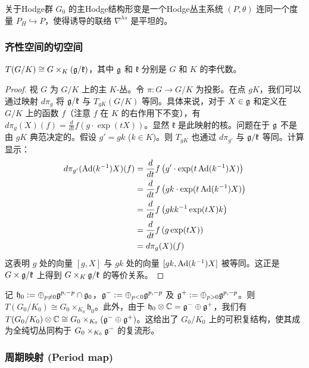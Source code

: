 \begin{definition}
关于Hodge群 $G_0$ 的主Hodge结构形变是一个Hodge丛主系统 $(P, \theta)$ 连同一个度量 $P_H \hookrightarrow P$，使得诱导的联络 $\nabla^{hs}$ 是平坦的。
\end{definition}

\subsubsection*{齐性空间的切空间}

\begin{proposition}\label{tangentbundleofhomogeneouspace}
$T(G/K) \cong G \times_K (\mathfrak{g}/\mathfrak{k})$，其中 $\mathfrak{g}$ 和 $\mathfrak{k}$ 分别是 $G$ 和 $K$ 的李代数。
\end{proposition}

\begin{proof}
视 $G$ 为 $G/K$ 上的主 $K$-丛。令 $\pi: G \to G/K$ 为投影。在点 $gK$，我们可以通过映射 $d\pi_g$ 将 $\mathfrak{g}/\mathfrak{k}$ 与 $T_{gK}(G/K)$ 等同。具体来说，对于 $X \in \mathfrak{g}$ 和定义在 $G/K$ 上的函数 $f$（注意 $f$ 在 $K$ 的右作用下不变），有 $d\pi_g(X)(f) = \frac{d}{dt} f(g \cdot \exp(tX))$。显然 $\mathfrak{k}$ 是此映射的核。问题在于 $\mathfrak{g}$ 不是由 $gK$ 典范决定的。假设 $g' = gk$ ($k \in K$)。则 $T_{gK}$ 也通过 $d\pi_{g'}$ 与 $\mathfrak{g}/\mathfrak{k}$ 等同。计算显示：
\[
\begin{aligned}
d\pi_{g'}(\operatorname{Ad}(k^{-1})X)(f) &= \frac{d}{dt} f\left(g' \cdot \exp(t\operatorname{Ad}(k^{-1})X)\right) \\
&= \frac{d}{dt} f\left(gk \cdot \exp(t\operatorname{Ad}(k^{-1})X)\right) \\
&= \frac{d}{dt} f\left(gkk^{-1} \exp(tX)k\right) \\
&= \frac{d}{dt} f\left(g \exp(tX)\right) \\
&= d\pi_g(X)(f)
\end{aligned}
\]
这表明 $g$ 处的向量 $[g, X]$ 与 $gk$ 处的向量 $[gk, \operatorname{Ad}(k^{-1})X]$ 被等同。这正是 $G \times \mathfrak{g}/\mathfrak{k}$ 上得到 $G \times_K \mathfrak{g}/\mathfrak{k}$ 的等价关系。
\end{proof}

记 $\mathfrak{h}_0 := \oplus_{p \neq 0} \mathfrak{g}^{p, -p} \cap \mathfrak{g}_0$，$\mathfrak{g}^- := \oplus_{p < 0} \mathfrak{g}^{p, -p}$ 及 $\mathfrak{g}^+ := \oplus_{p > 0} \mathfrak{g}^{p, -p}$。则 $T(G_0/K_0) \cong G_0 \times_{K_0} \mathfrak{h}_0$。此外，由于 $\mathfrak{h}_0 \otimes \mathbb{C} = \mathfrak{g}^- \oplus \mathfrak{g}^+$，我们有 $T(G_0/K_0) \otimes \mathbb{C} \cong G_0 \times_{K_0} (\mathfrak{g}^- \oplus \mathfrak{g}^+)$。这给出了 $G_0/K_0$ 上的可积复结构，使其成为全纯切丛同构于 $G_0 \times_{K_0} \mathfrak{g}^-$ 的复流形。

\subsubsection*{周期映射 (Period map)}

